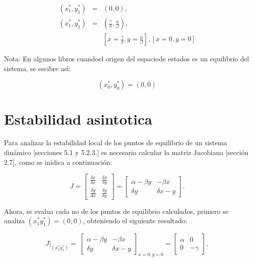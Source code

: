\documentclass[letterpaper,11pt]{article}
\begin{document}
\bigskip 
\begin{eqnarray*}
(x_{1}^{\ast },y_{1}^{\ast }) &=&(0,0), \\
(x_{1}^{\ast },y_{1}^{\ast }) &=&\left( \frac{\gamma }{\delta },\frac{\alpha 
}{\beta }\right) , \\
&&\left[ x=\frac{\gamma }{\delta },y=\frac{\alpha }{\beta }\right] ,\left[
x=0,y=0\right]
\end{eqnarray*}

Nota: En algunos libros cuandoel origen del espaciode estados es un
equilibrio del sistema, se escibre as\'{\i}:

\begin{equation*}
(x_{0}^{\ast },y_{0}^{\ast })=(0,0)
\end{equation*}

\section{Estabilidad asintotica}

Para analizar la estabilidad local de los puntos de equilibrio de un sistema
din\'{a}mico [secciones 5.1 y 5.2.3.] es necesario calcular la matriz
Jacobiana [secci\'{o}n 2.7], como se inidica a continuaci\'{o}n:

\begin{equation*}
J=\left[ 
\begin{array}{cc}
\frac{\delta \dot{x}}{\delta x} & \frac{\delta \dot{x}}{\delta y} \\ 
\frac{\delta \dot{y}}{dx} & \frac{\delta \dot{y}}{\delta y}%
\end{array}%
\right] =\left[ 
\begin{array}{cc}
\alpha -\beta y & -\beta x \\ 
\delta y & \delta x-y%
\end{array}%
\right] .
\end{equation*}

Ahora, se evalua cada no de los puntos de equilibrio calculados, primero se
analiza $(x_{1}^{\ast }y_{1}^{\ast })=(0,0)$, obteniendo el siguiente
resultado:

\begin{equation*}
\left. J\right\vert _{(x_{1}^{\ast }y_{1}^{\ast })}=\ \left[ 
\begin{array}{cc}
\alpha -\beta y & -\beta x \\ 
\delta y & \delta x-y%
\end{array}%
\right] _{x=0,y=0}=\left[ 
\begin{array}{cc}
\alpha  & 0 \\ 
0 & -\gamma 
\end{array}%
\right] ,
\end{equation*}
\end{document}
